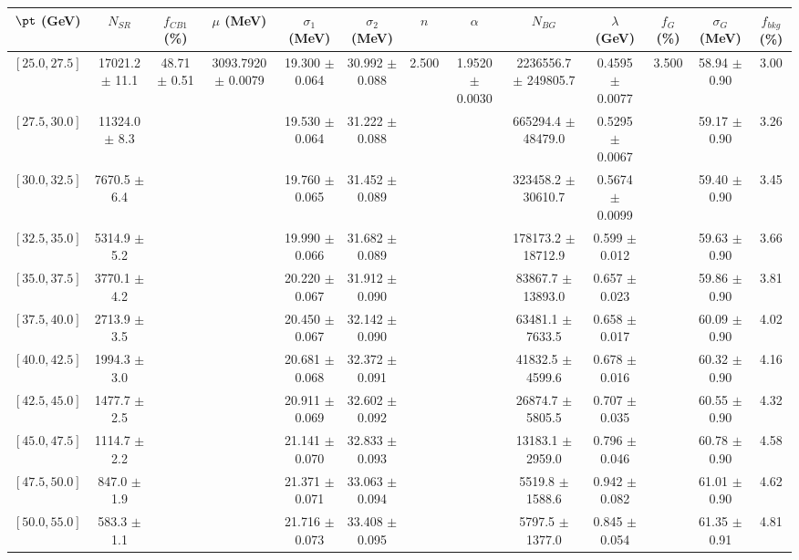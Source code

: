 \begin{tabular}{c||c|c|c|c|c|c|c|c|c|c|c||c}
$\pt$ (GeV) & $N_{SR}$ & $f_{CB1}$ (\%) & $\mu$ (MeV) & $\sigma_1$ (MeV) & $\sigma_2$ (MeV) & $n$ & $\alpha$ & $N_{BG}$ & $\lambda$ (GeV) & $f_G$ (\%) & $\sigma_G$ (MeV) & $f_{bkg}$ (\%) \\
\hline
$[25.0, 27.5]$ & 17021.2 $\pm$ 11.1 & \multirow{19}{*}{48.71 $\pm$ 0.51} & \multirow{19}{*}{3093.7920 $\pm$ 0.0079} & 19.300 $\pm$ 0.064 & 30.992 $\pm$ 0.088 & \multirow{19}{*}{2.500} & \multirow{19}{*}{1.9520 $\pm$ 0.0030} & 2236556.7 $\pm$ 249805.7 & 0.4595 $\pm$ 0.0077 & \multirow{19}{*}{3.500} & 58.94 $\pm$ 0.90 & 3.00\\
$[27.5, 30.0]$ & 11324.0 $\pm$ 8.3 &  &  & 19.530 $\pm$ 0.064 & 31.222 $\pm$ 0.088 &  &  & 665294.4 $\pm$ 48479.0 & 0.5295 $\pm$ 0.0067 &  & 59.17 $\pm$ 0.90 & 3.26\\
$[30.0, 32.5]$ & 7670.5 $\pm$ 6.4 &  &  & 19.760 $\pm$ 0.065 & 31.452 $\pm$ 0.089 &  &  & 323458.2 $\pm$ 30610.7 & 0.5674 $\pm$ 0.0099 &  & 59.40 $\pm$ 0.90 & 3.45\\
$[32.5, 35.0]$ & 5314.9 $\pm$ 5.2 &  &  & 19.990 $\pm$ 0.066 & 31.682 $\pm$ 0.089 &  &  & 178173.2 $\pm$ 18712.9 & 0.599 $\pm$ 0.012 &  & 59.63 $\pm$ 0.90 & 3.66\\
$[35.0, 37.5]$ & 3770.1 $\pm$ 4.2 &  &  & 20.220 $\pm$ 0.067 & 31.912 $\pm$ 0.090 &  &  & 83867.7 $\pm$ 13893.0 & 0.657 $\pm$ 0.023 &  & 59.86 $\pm$ 0.90 & 3.81\\
$[37.5, 40.0]$ & 2713.9 $\pm$ 3.5 &  &  & 20.450 $\pm$ 0.067 & 32.142 $\pm$ 0.090 &  &  & 63481.1 $\pm$ 7633.5 & 0.658 $\pm$ 0.017 &  & 60.09 $\pm$ 0.90 & 4.02\\
$[40.0, 42.5]$ & 1994.3 $\pm$ 3.0 &  &  & 20.681 $\pm$ 0.068 & 32.372 $\pm$ 0.091 &  &  & 41832.5 $\pm$ 4599.6 & 0.678 $\pm$ 0.016 &  & 60.32 $\pm$ 0.90 & 4.16\\
$[42.5, 45.0]$ & 1477.7 $\pm$ 2.5 &  &  & 20.911 $\pm$ 0.069 & 32.602 $\pm$ 0.092 &  &  & 26874.7 $\pm$ 5805.5 & 0.707 $\pm$ 0.035 &  & 60.55 $\pm$ 0.90 & 4.32\\
$[45.0, 47.5]$ & 1114.7 $\pm$ 2.2 &  &  & 21.141 $\pm$ 0.070 & 32.833 $\pm$ 0.093 &  &  & 13183.1 $\pm$ 2959.0 & 0.796 $\pm$ 0.046 &  & 60.78 $\pm$ 0.90 & 4.58\\
$[47.5, 50.0]$ & 847.0 $\pm$ 1.9 &  &  & 21.371 $\pm$ 0.071 & 33.063 $\pm$ 0.094 &  &  & 5519.8 $\pm$ 1588.6 & 0.942 $\pm$ 0.082 &  & 61.01 $\pm$ 0.90 & 4.62\\
$[50.0, 55.0]$ & 583.3 $\pm$ 1.1 &  &  & 21.716 $\pm$ 0.073 & 33.408 $\pm$ 0.095 &  &  & 5797.5 $\pm$ 1377.0 & 0.845 $\pm$ 0.054 &  & 61.35 $\pm$ 0.91 & 4.81\\

\end{tabular}
